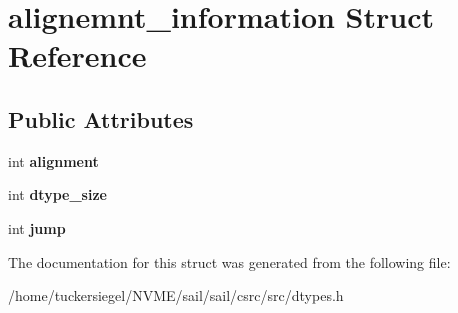 \hypertarget{structalignemnt__information}{}\section{alignemnt\+\_\+information Struct Reference}
\label{structalignemnt__information}
\subsection*{Public Attributes}
\begin{DoxyCompactItemize}
\item 
\mbox{\label{structalignemnt__information_a092a26827beccdb8eac56dcad0d237aa}} 
int {\bfseries alignment}
\item 
\mbox{\label{structalignemnt__information_a8459d0c5eb17e59e7bac67d5a837cc60}} 
int {\bfseries dtype\+\_\+size}
\item 
\mbox{\label{structalignemnt__information_a973d38a04bc603a21bed6141784014f1}} 
int {\bfseries jump}
\end{DoxyCompactItemize}


The documentation for this struct was generated from the following file\+:\begin{DoxyCompactItemize}
\item 
/home/tuckersiegel/\+N\+V\+M\+E/sail/sail/csrc/src/dtypes.\+h\end{DoxyCompactItemize}
